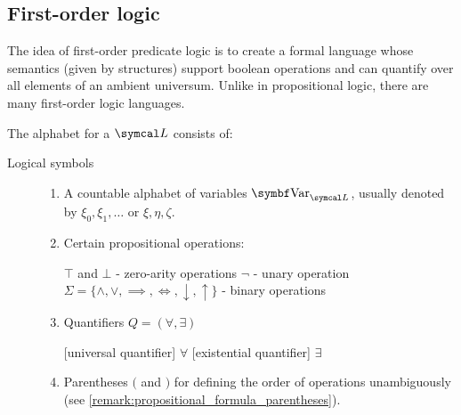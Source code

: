 \subsection{First-order logic}\label{subsec:first_order_logic}

\begin{definition}\label{def:first_order_logic_language}\cite[187]{OpenLogic20201202}
  The idea of first-order predicate logic is to create a formal language whose semantics (given by structures) support boolean operations and can quantify over all elements of an ambient universum. Unlike in propositional logic, there are many first-order logic languages.

  The alphabet for a  \( \Cal{L} \) consists of:
  \begin{description}
    \item[Logical symbols]
    \mbox{}
    \begin{enumerate}
      \item A countable alphabet of variables \( \Cat{Var}_{\Cal{L}} \), usually denoted by \( \xi_0, \xi_1, \ldots \) or \( \xi, \eta, \zeta \).

      \item Certain propositional operations:
      \begin{description}
         \( \top \) and \( \bot \) - zero-arity operations
         \( \neg \) - unary operation
         \( \Sigma = \{ \land, \lor, \implies, \iff, \downarrow, \uparrow \} \) - binary operations
      \end{description}

      \item Quantifiers \( Q = ( \forall, \exists ) \)
      \begin{description}
        [universal quantifier] \( \forall \)
        [existential quantifier] \( \exists \)
      \end{description}

      \item Parentheses \( ( \) and \( ) \) for defining the order of operations unambiguously (see \cref{remark:propositional_formula_parentheses}).


\end{enumerate}
\end{description}
\end{definition}
